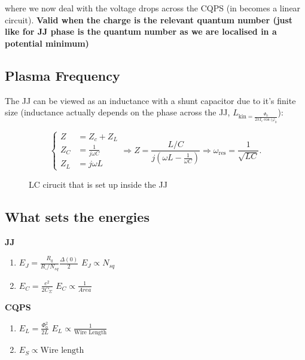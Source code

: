 \noindent where we now deal with the voltage drops across the CQPS (in becomes a
linear circuit).  \textbf{Valid  when the charge is the  relevant quantum number
  (just  like for  JJ phase  is the  quantum  number as  we are  localised in  a
  potential minimum)}

\subsection{Plasma Frequency}
\label{sec:plasma-frequency}

The JJ can be viewed as an inductance  with a shunt capacitor due to it's finite
size   (inductance   actually   depends   on    the   phase   across   the   JJ,
$L_{\text{kin} = \frac{\Phi_{0}}{2\pi I_c\cos(\varphi_0}}$):

\begin{equation}
  \left\{
    \begin{aligned}
      Z & = Z_{c} + Z_L \\
      Z_C & = \frac{1}{j\omega C}\\
      Z_L & = j\omega L
    \end{aligned}
  \right. \Rightarrow Z = \frac{L/C}{j \left( \omega L - \frac{1}{\omega
        C}
    \right)} \Rightarrow \omega_{\text{res}} = \frac{1}{\sqrt{LC}}.
\end{equation}


\noindent
\begin{figure}[h]
  \centering {}
  \caption{\small    LC     cirucit    that    is    set     up    inside    the
    JJ\label{fig:lc_resonance}}
\end{figure}

\subsection{What sets the energies}
\label{sec:what-sets-energies}

\begin{minipage}{0.45\textwidth}
  \begin{framed}\noindent
    \textbf{JJ}
    \begin{enumerate}
    \item  $E_J  =  \frac{R_{q}}{R_{\square}/N_{sq}}\frac{\Delta(0)}{2}$  \hfill
      $E_J \propto N_{sq}$
    \item $E_C = \frac{e^2}{2C_{\Sigma}}$ \hfill $E_C \propto \frac{1}{Area}$
    \end{enumerate}
  \end{framed}
\end{minipage}
\begin{minipage}{0.45\textwidth}
  \begin{framed}\noindent
    \textbf{CQPS}
    \begin{enumerate}
    \item          $E_L          =          \frac{\Phi_0^2}{2L}$          \hfill
      $E_L \propto \frac{1}{\text{Wire Length}}$
    \item \hfill $E_S \propto \text{Wire length}$
    \end{enumerate}
  \end{framed}
\end{minipage}

